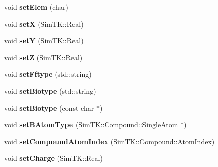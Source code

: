 \begin{DoxyCompactItemize}
\item 
void {\bfseries set\+Elem} (char)\hypertarget{classbSpecificAtom_afa5eb1ed2443aa8ef11d67e9e80b025c}{}\label{classbSpecificAtom_afa5eb1ed2443aa8ef11d67e9e80b025c}

\item 
void {\bfseries setX} (Sim\+T\+K\+::\+Real)\hypertarget{classbSpecificAtom_a3355bb7e3b2e11fe89cc9f193cc4505b}{}\label{classbSpecificAtom_a3355bb7e3b2e11fe89cc9f193cc4505b}

\item 
void {\bfseries setY} (Sim\+T\+K\+::\+Real)\hypertarget{classbSpecificAtom_a037a450a9088a2b6a1cb7899e0acb35a}{}\label{classbSpecificAtom_a037a450a9088a2b6a1cb7899e0acb35a}

\item 
void {\bfseries setZ} (Sim\+T\+K\+::\+Real)\hypertarget{classbSpecificAtom_ab01905080c3a8c269c46a005a2ea1bd3}{}\label{classbSpecificAtom_ab01905080c3a8c269c46a005a2ea1bd3}

\item 
void {\bfseries set\+Fftype} (std\+::string)\hypertarget{classbSpecificAtom_a57847988cc394a6231e737c76d1399f3}{}\label{classbSpecificAtom_a57847988cc394a6231e737c76d1399f3}

\item 
void {\bfseries set\+Biotype} (std\+::string)\hypertarget{classbSpecificAtom_a08a35dc29d06bd29c0a20e2de8840916}{}\label{classbSpecificAtom_a08a35dc29d06bd29c0a20e2de8840916}

\item 
void {\bfseries set\+Biotype} (const char $\ast$)\hypertarget{classbSpecificAtom_aca8a6d24c5c492702366509e7f22331b}{}\label{classbSpecificAtom_aca8a6d24c5c492702366509e7f22331b}

\item 
void {\bfseries set\+B\+Atom\+Type} (Sim\+T\+K\+::\+Compound\+::\+Single\+Atom $\ast$)\hypertarget{classbSpecificAtom_acae03ffcc3bc16f911bae507bb85c87d}{}\label{classbSpecificAtom_acae03ffcc3bc16f911bae507bb85c87d}

\item 
void {\bfseries set\+Compound\+Atom\+Index} (Sim\+T\+K\+::\+Compound\+::\+Atom\+Index)\hypertarget{classbSpecificAtom_a9c9115b31007572993d3e6002ddcd4da}{}\label{classbSpecificAtom_a9c9115b31007572993d3e6002ddcd4da}

\item 
void {\bfseries set\+Charge} (Sim\+T\+K\+::\+Real)\hypertarget{classbSpecificAtom_a5cca33607d2c34295614c7d5057b44c8}{}\label{classbSpecificAtom_a5cca33607d2c34295614c7d5057b44c8}


\end{DoxyCompactItemize}
